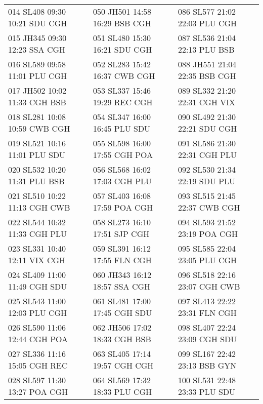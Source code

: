 \documentclass{endm}
\begin{document}
\begin{center}
\begin{longtable}{lll}
  \scriptsize014 SL408 09:30 10:21 SDU CGH    & \scriptsize  050 JH501 14:58 16:29 BSB CGH   &  \scriptsize  086 SL577 21:02 22:03 PLU CGH   \\
  \scriptsize015 JH345 09:30 12:23 SSA CGH   & \scriptsize  051 SL480 15:30 16:21 SDU CGH   &   \scriptsize  087 SL536 21:04 22:13 PLU BSB  \\
  \scriptsize016 SL589 09:58 11:01 PLU CGH    & \scriptsize  052 SL283 15:42 16:37 CWB CGH  &  \scriptsize   088 JH551 21:04 22:35 BSB CGH  \\
  \scriptsize017 JH502 10:02 11:33 CGH BSB   & \scriptsize  053 SL337 15:46 19:29 REC CGH    &  \scriptsize  089 SL332 21:20 22:31 CGH VIX  \\
  \scriptsize018 SL281 10:08 10:59 CWB CGH & \scriptsize  054 SL347 16:00 16:45 PLU SDU    &    \scriptsize  090 SL492 21:30 22:21 SDU CGH\\
  \scriptsize019 SL521 10:16 11:01 PLU SDU  & \scriptsize 055 SL598  16:00 17:55 CGH POA    &    \scriptsize  091 SL586 21:30 22:31 CGH PLU\\
  \scriptsize020 SL532 10:20 11:31 PLU BSB   & \scriptsize056 SL568 16:02 17:03 CGH PLU  &    \scriptsize 092 SL530 21:34 22:19 SDU PLU\\
  \scriptsize021 SL510 10:22 11:13 CGH CWB & \scriptsize057 SL403 16:08 17:59 POA CGH   &  \scriptsize  093 SL515 21:45 22:37 CWB CGH\\
  \scriptsize022 SL544 10:32 11:33 CGH PLU & \scriptsize058 SL273 16:10 17:51 SJP CGH   &   \scriptsize  094 SL593 21:52 23:19 POA CGH \\
  \scriptsize023 SL331 10:40 12:11 VIX CGH   & \scriptsize059 SL391 16:12 17:55 FLN CGH  &  \scriptsize  095 SL585 22:04 23:05 PLU CGH  \\
 \scriptsize 024 SL409 11:00 11:49 CGH SDU  & \scriptsize 060 JH343 16:12 18:57 SSA CGH &  \scriptsize 096 SL518 22:16 23:07 CGH CWB    \\
 \scriptsize 025 SL543 11:00 12:03 PLU CGH & \scriptsize 061 SL481 17:00 17:45 CGH SDU   &   \scriptsize  097 SL413 22:22 23:31 FLN CGH \\
 \scriptsize 026 SL590 11:06 12:44 CGH POA  & \scriptsize 062 JH506 17:02 18:33 CGH BSB &   \scriptsize  098 SL407 22:24 23:09 CGH SDU \\
 \scriptsize 027 SL336 11:16 15:05 CGH REC  & \scriptsize063 SL405 17:14 19:57 CGH CGH   &   \scriptsize   099 SL167 22:42 23:13 BSB GYN\\
 \scriptsize 028 SL597 11:30 13:27 POA CGH   &  \scriptsize 064 SL569 17:32 18:33 PLU CGH  &   \scriptsize  100 SL531 22:48 23:33 PLU SDU \\

\end{longtable}
\end{center}
\end{document}
